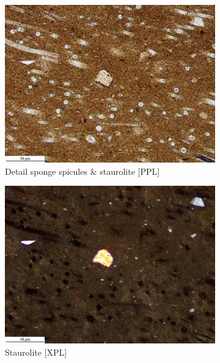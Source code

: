 \documentclass[a4paper]{article}
\begin{document}
\begin{figure}[H]
\begin{subfigure}[t]{.49\textwidth}
		\includegraphics[width=\textwidth]{ThinSections/47-3_20x_PPL.jpg}
		\caption{Detail sponge spicules \& staurolite [PPL]}
	\end{subfigure}\hspace{.5em}\hfill
	\begin{subfigure}[t]{.49\textwidth}
		\includegraphics[width=\textwidth]{ThinSections/47-3_20x_XPL.jpg}
		\caption{Staurolite [XPL]}
	\end{subfigure}
	\begin{subfigure}[t]{.32\textwidth}

\end{subfigure}
\end{figure}
\end{document}
